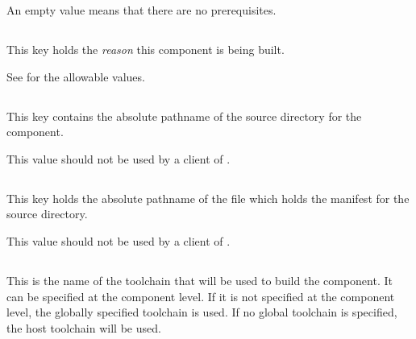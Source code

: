 An empty value means that there are no prerequisites.


\subsection{}\label{variables:reason}

This key holds the \emph{reason} this component is being built.

See  for the allowable values.


\subsection{}\label{variables:source-directory}

This key contains the absolute pathname of the source directory for
the component.

This value should not be used by a client of \lmsbw.


\subsection{}\label{variables:source-mtree-manifest}

This key holds the absolute pathname of the file which holds the
\mtree manifest for the source directory.

This value should not be used by a client of \lmsbw.


\subsection{}\label{variables:toolchain}

This is the name of the toolchain that will be used to build the
component.  It can be specified at the component level.  If it is not
specified at the component level, the globally specified toolchain is
used.  If no global toolchain is specified, the host toolchain will be
used.

